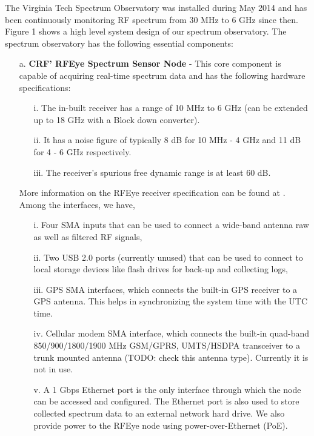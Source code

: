 \documentclass[12pt,sts]{report}
\begin{document}
The Virginia Tech Spectrum Observatory was installed during May 2014 and has been continuously monitoring RF spectrum from 30 MHz to 6 GHz since then. Figure 1 shows a high level system design of our spectrum observatory. The spectrum observatory has the following essential components:
\begin{enumerate}
	\item[a.] \textbf{CRF' RFEye Spectrum Sensor Node} - This core component is capable of acquiring real-time spectrum data and has the following hardware specifications:
	\begin{enumerate}
		\item[i.] The in-built receiver has a range of 10 MHz to 6 GHz (can be extended up to 18 GHz with a Block down converter).
		\item[ii.] It has a noise figure of typically 8 dB for 10 MHz - 4 GHz and 11 dB for 4 - 6 GHz respectively.
		\item[iii.] The receiver's spurious free dynamic range is at least 60 dB.
	\end{enumerate}
	More information on the RFEye receiver specification can be found at \cite{rfeye_specs}.
	Among the interfaces, we have, 
	\begin{enumerate}
		\item[i.] Four SMA inputs that can be used to connect a wide-band antenna  raw as well as filtered RF signals, 
		\item[ii.] Two USB  2.0 ports (currently unused) that can be used to connect to local storage devices like flash drives for back-up and collecting logs, 
		\item[iii.] GPS SMA interfaces, which connects the built-in GPS receiver to a GPS antenna. This helps in synchronizing the system time with the UTC time.
		\item[iv.] Cellular modem SMA interface, which connects the built-in quad-band 850/900/1800/1900 MHz GSM/GPRS, UMTS/HSDPA transceiver to a trunk mounted antenna (TODO: check this antenna type). Currently it is not in use.
		\item[v.] A 1 Gbps Ethernet port is the only interface through which the node can be accessed and configured. The Ethernet port is also used to store collected spectrum data to an external network hard drive. We also provide power to the RFEye node using power-over-Ethernet (PoE).
	\end{enumerate}
	

\end{enumerate}
\end{document}
